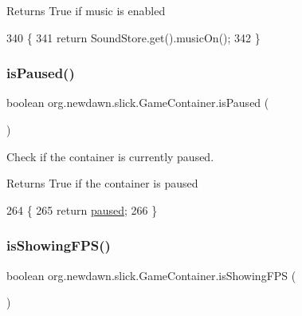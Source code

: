 \begin{DoxyReturn}{Returns}
True if music is enabled 
\end{DoxyReturn}

\begin{DoxyCode}
340                                \{
341         \textcolor{keywordflow}{return} SoundStore.get().musicOn();
342     \}
\end{DoxyCode}
\mbox{\label{classorg_1_1newdawn_1_1slick_1_1_game_container_a490ab225a7cb47e4ef3927cfb9549891}} 
\subsubsection{\texorpdfstring{is\+Paused()}{isPaused()}}
{\footnotesize\ttfamily boolean org.\+newdawn.\+slick.\+Game\+Container.\+is\+Paused (\begin{DoxyParamCaption}{ }\end{DoxyParamCaption})\hspace{0.3cm}{\ttfamily [inline]}}

Check if the container is currently paused.

\begin{DoxyReturn}{Returns}
True if the container is paused 
\end{DoxyReturn}

\begin{DoxyCode}
264                               \{
265         \textcolor{keywordflow}{return} \mbox{\hyperlink{classorg_1_1newdawn_1_1slick_1_1_game_container_ae3b73023cf30def1b0b019f6e60dd022}{paused}};
266     \}
\end{DoxyCode}
\mbox{\label{classorg_1_1newdawn_1_1slick_1_1_game_container_a149e3a3bcbfa6122703db955b47e9a38}} 
\subsubsection{\texorpdfstring{is\+Showing\+F\+P\+S()}{isShowingFPS()}}
{\footnotesize\ttfamily boolean org.\+newdawn.\+slick.\+Game\+Container.\+is\+Showing\+F\+PS (\begin{DoxyParamCaption}{ }\end{DoxyParamCaption})\hspace{0.3cm}{\ttfamily [inline]}}

